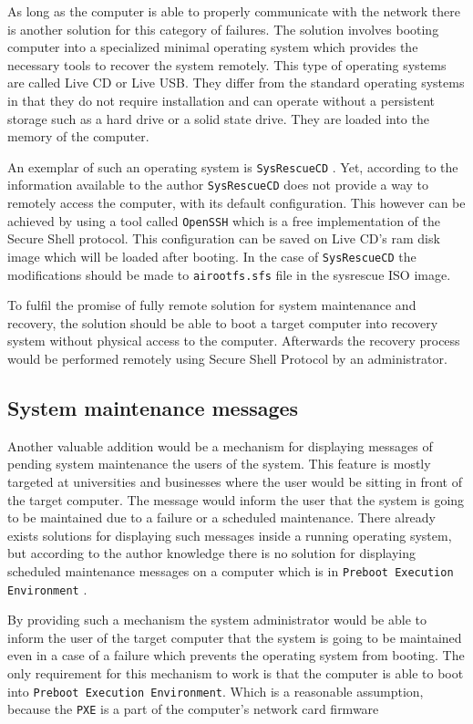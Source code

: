 \documentclass[../main.tex]{subfiles}
\begin{document}
As long as the computer is able to properly communicate with the network there is another solution for this category
of failures. The solution involves booting computer into a specialized minimal operating system which provides
the necessary tools to recover the system remotely. This type of operating systems are called Live CD \cite{livecdlist} or Live USB.
They differ from the standard operating systems in that they do not require installation and can operate without
a persistent storage such as a hard drive or a solid state drive. They are loaded into the memory of the computer.

An exemplar of such an operating system is \texttt{SysRescueCD} \cite{sysrescuecd}.
Yet, according to the information available to the author \texttt{SysRescueCD} does not provide a way to remotely access the computer,
with its default configuration. This however can be achieved by using a tool called \texttt{OpenSSH} \cite{openssh} which is a free implementation of the Secure Shell protocol.
This configuration can be saved on Live CD's ram disk image which will be loaded after booting. In the case of
\texttt{SysRescueCD} the modifications should be made to \texttt{airootfs.sfs} file in the sysrescue ISO image.

To fulfil the promise of fully remote solution for system maintenance and recovery, the solution should be able to
boot a target computer into recovery system without physical access to the computer. Afterwards the recovery process
would be performed remotely using Secure Shell Protocol by an administrator.

\subsection{System maintenance messages}
Another valuable addition would be a mechanism for displaying messages of pending system maintenance the users of the system.
This feature is mostly targeted at universities and businesses where the user would be sitting in front of the target computer.
The message would inform the user that the system is going to be maintained due to a failure or a scheduled maintenance.
There already exists solutions for displaying such messages inside a running operating system, but according
to the author knowledge there is no solution for displaying scheduled maintenance messages on a computer which is in \texttt{Preboot Execution Environment} \cite{pxespec}.

By providing such a mechanism the system administrator would be able to inform the user of the target computer that
the system is going to be maintained even in a case of a failure which prevents the operating system from booting.
The only requirement for this mechanism to work is that the computer is able to boot into \texttt{Preboot Execution Environment}.
Which is a reasonable assumption, because the \texttt{PXE} is a part of the computer's network card firmware
\end{document}
